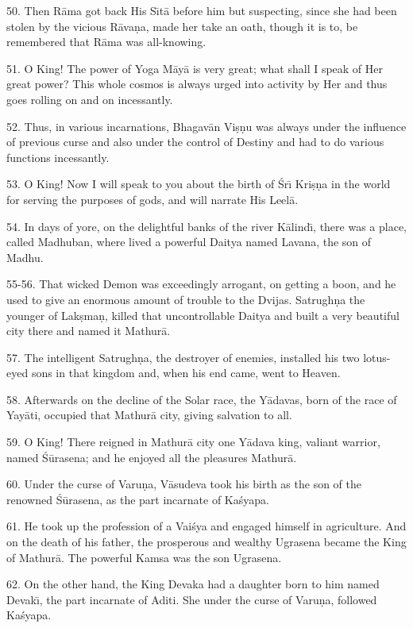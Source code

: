50. Then R\=ama got back His S\={\i}t\=a before him but suspecting, since she had been stolen by the vicious R\=ava\d{n}a, made her take an oath, though it is to, be remembered that R\=ama was all-knowing.

51. O King! The power of Yoga M\=ay\=a is very great; what shall I speak of Her great power? This whole cosmos is always urged into activity by Her and thus goes rolling on and on incessantly.

52. Thus, in various incarnations, Bhagav\=an Vi\d{s}\d{n}u was always under the influence of previous curse and also under the control of Destiny and had to do various functions incessantly.

53. O King! Now I will speak to you about the birth of \'Sr\={\i} Kri\d{s}\d{n}a in the world for serving the purposes of gods, and will narrate His Leel\=a.

54. In days of yore, on the delightful banks of the river K\=alind\={\i}, there was a place, called Madhuban, where lived a powerful Daitya named Lavana, the son of Madhu.

55-56. That wicked Demon was exceedingly arrogant, on getting a boon, and he used to give an enormous amount of trouble to the Dvijas. Satrugh\d{n}a the younger of Lak\d{s}ma\d{n}, killed that uncontrollable Daitya and built a very beautiful city there and named it Mathur\=a.

57. The intelligent Satrugh\d{n}a, the destroyer of enemies, installed his two lotus-eyed sons in that kingdom and, when his end came, went to Heaven.

58. Afterwards on the decline of the Solar race, the Y\=adavas, born of the race of Yay\=ati, occupied that Mathur\=a city, giving salvation to all.

59. O King! There reigned in Mathur\=a city one Y\=adava king, valiant warrior, named \'S\=urasena; and he enjoyed all the pleasures Mathur\=a.

60. Under the curse of Varu\d{n}a, V\=asudeva took his birth as the son of the renowned \'S\=urasena, as the part incarnate of Ka\'syapa.

61. He took up the profession of a Vai\'sya and engaged himself in agriculture. And on the death of his father, the prosperous and wealthy Ugrasena became the King of Mathur\=a. The powerful Kamsa was the son Ugrasena.

62. On the other hand, the King Devaka had a daughter born to him named Devak\={\i}, the part incarnate of Aditi. She under the curse of Varu\d{n}a, followed Ka\'syapa.

